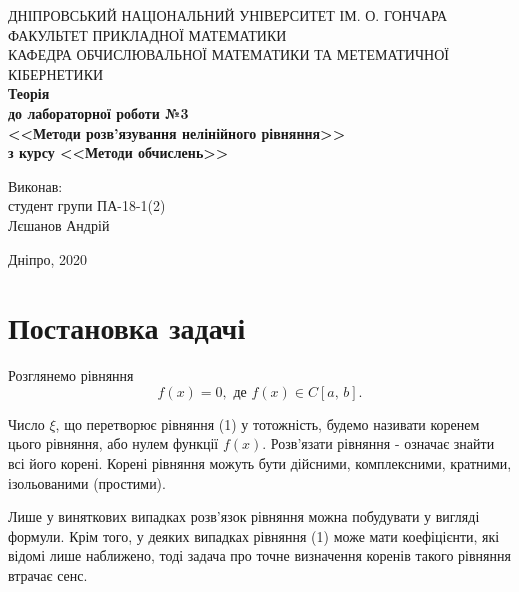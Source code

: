 \documentclass[14pt,a4paper,titlepage]{extarticle}
\begin{document}
      \begin{titlepage}
         \begin{center}
ДНІПРОВСЬКИЙ НАЦІОНАЛЬНИЙ УНІВЕРСИТЕТ ІМ. О. ГОНЧАРА\\
ФАКУЛЬТЕТ ПРИКЛАДНОЇ МАТЕМАТИКИ\\
КАФЕДРА ОБЧИСЛЮВАЛЬНОЇ МАТЕМАТИКИ ТА МЕТЕМАТИЧНОЇ
КІБЕРНЕТИКИ\\
            \vspace{6cm}
            \bf Теорія\\
            \bf до лабораторної роботи №3\\
            \bf <<Методи розв’язування нелінійного рівняння>>\\
            \bf з курсу <<Методи обчислень>>\\
        \end{center}
        \vspace{5cm}
        \begin{flushright}
Виконав:\\
студент групи ПА-18-1(2)\\
Лєшанов Андрій
        \end{flushright}
        \begin{center}
        \vspace{3.5cm}
        Дніпро, 2020
        \end{center}
   \end{titlepage}
\setcounter{page}{2}
\newpage
{\centering\tableofcontents}
\newpage
{\centering \section*{Постановка задачі}}

Розглянемо рівняння
\begin{equation}
f(x)=0,\text{ де } f(x)\in C[a,\, b].
\end{equation}

Число $\xi$, що перетворює рівняння (1) у тотожність, будемо називати коренем цього рівняння, або нулем функції $f(x)$. Розв'язати рівняння - означає знайти всі його корені. Корені рівняння можуть бути дійсними, комплексними, кратними, ізольованими (простими).

Лише у виняткових випадках розв'язок рівняння можна побудувати у вигляді формули. Крім того, у деяких випадках рівняння (1) може мати коефіцієнти, які відомі лише наближено, тоді задача про точне визначення коренів такого рівняння втрачає сенс.
\end{document}
